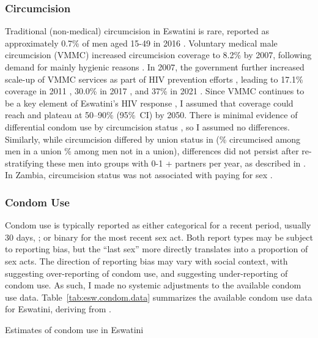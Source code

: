 \subsubsection{Circumcision}\label{model.par.tm.circ}
Traditional (non-medical) circumcision in Eswatini is rare,
reported as approximately 0.7\% of men aged 15-49 in 2016 \cite{SHIMS2}.
Voluntary medical male circumcision (VMMC) increased circumcision coverage to 8.2\% by 2007,
following demand for mainly hygienic reasons \cite{SDHS2006}.
In 2007, the government further increased scale-up of VMMC services
as part of HIV prevention efforts \cite{SDHS2006}, leading to
17.1\% coverage in 2011 \cite{SHIMS1},
30.0\% in 2017 \cite{SHIMS2}, and
37\% in 2021 \cite{EswCOP21}.
Since VMMC continues to be a key element of Eswatini's HIV response \cite{EswCOP21},
I assumed that coverage could reach and plateau at 50--90\% (95\%~CI) by 2050.
There is minimal evidence of differential condom use by circumcision status \cite{SHIMS1},
so I assumed no differences.
Similarly, while circumcision differed by union status in \cite{SHIMS2}
(\% circumcised among men in a union \% among men not in a union),
differences did not persist after re-stratifying these men
into groups with 0-1 + partners per year, as described in .
In Zambia, circumcision status was not associated with paying for sex \cite{Carrasco2020}.
\subsubsection{Condom Use}\label{model.par.tm.condom}
Condom use is typically reported as either
categorical for a recent period, usually 30 days,
\eg {}; or
binary for the most recent sex act.
Both report types may be subject to reporting bias,
but the ``last sex'' more directly translates into a proportion of sex acts.
The direction of reporting bias may vary with social context, with
\cite{Cordero-Coma2012} suggesting over-reporting of condom use, and
\cite{Behanzin2013} suggesting under-reporting of condom use.
As such, I made no systemic adjustments to the available condom use data.
Table~\ref{tab:esw.condom.data} summarizes the available condom use data for Eswatini,
deriving from \cite{SFHS1988,EswBSS2002,SDHS2006,Baral2014,EswKP2014,SHIMS2}.
\begin{table}
  \centering
  \caption{Estimates of condom use in Eswatini}
  \label{tab:esw.condom.data}
  
\end{table}
